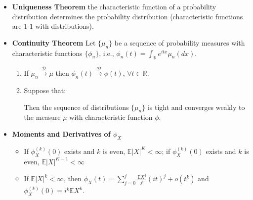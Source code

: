 \documentclass[11pt]{article}
\newcommand{\bbr}{\mathbb{R}}
\newcommand{\gf}{\phi}
\newcommand\abs[1]{\left|#1\right|}
\renewcommand{\to}{\longrightarrow}
\newcommand{\dto}{\overset{\mathcal{D}}{\to}}
\newcommand{\E}{\mathbb{E}}
\newcommand{\gm}{\mu}
\newcommand{\seq}[1]{\{#1\}}
\begin{document}
\begin{multicols}{2}
\begin{itemize}
\begin{enumerate}
\end{enumerate}
\item \textbf{Uniqueness Theorem} the characteristic function of a probability distribution determines the probability distribution (characteristic functions are 1-1 with distributions).
\item \textbf{Continuity Theorem} Let $\seq{\mu_n}$ be a sequence of probability measures with characteristic functions $\seq{\gf_n}$, i.e., $\gf_n(t) = \int_\bbr e^{itx} \mu_n(dx)$.
\begin{enumerate}
\item If $\mu_n \dto \mu$ then $\gf_n(t) \dto \gf(t)$, $\forall t \in \bbr$.
\item Suppose that: 
Then the sequence of distributions $\seq{\mu_n}$ is tight and converges weakly to the measure $\gm$ with characteristic function $\gf$.
\end{enumerate}
\item \textbf{Moments and Derivatives of $\gf_X$}
\begin{itemize}
\item If $\gf_X^{(k)}(0)$ exists and $k$ is even, $\E \abs{X}^K <\infty$; if $\gf_X^{(k)}(0)$ exists and $k$ is even, $\E \abs{X}^{K-1} <\infty$
\item If $\E \abs{X}^k < \infty$, then $\gf_X(t) = \sum_{j=0}^j \frac{\E X^j}{j!}(it)^j+ o(t^k)$ and $\gf_X^{(k)}(0)=i^k \E X^k$.
\end{itemize}
\end{itemize}

\end{multicols}
\end{document}
